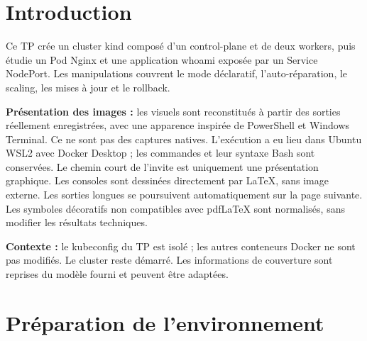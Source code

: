 \documentclass[11pt,a4paper]{article}
\begin{document}
\section*{Introduction}
Ce TP crée un cluster kind composé d'un control-plane et de deux workers, puis étudie un Pod Nginx et une application whoami exposée par un Service NodePort. Les manipulations couvrent le mode déclaratif, l'auto-réparation, le scaling, les mises à jour et le rollback.

\textbf{Présentation des images :} les visuels sont reconstitués à partir des sorties réellement enregistrées, avec une apparence inspirée de PowerShell et Windows Terminal. Ce ne sont pas des captures natives. L'exécution a eu lieu dans Ubuntu WSL2 avec Docker Desktop ; les commandes et leur syntaxe Bash sont conservées. Le chemin court de l'invite est uniquement une présentation graphique. Les consoles sont dessinées directement par LaTeX, sans image externe. Les sorties longues se poursuivent automatiquement sur la page suivante. Les symboles décoratifs non compatibles avec pdfLaTeX sont normalisés, sans modifier les résultats techniques.

\textbf{Contexte :} le kubeconfig du TP est isolé ; les autres conteneurs Docker ne sont pas modifiés. Le cluster reste démarré. Les informations de couverture sont reprises du modèle fourni et peuvent être adaptées.

\clearpage
\section{Préparation de l'environnement}
\end{document}
